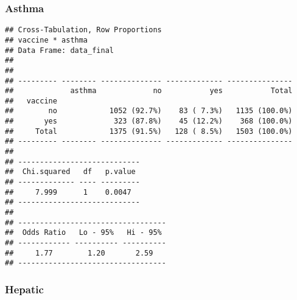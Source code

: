 \documentclass[
]{article}
\newenvironment{Shaded}{\begin{snugshade}}{\end{snugshade}}
\newcommand{\AttributeTok}[1]{\textcolor[rgb]{0.77,0.63,0.00}{#1}}
\newcommand{\ConstantTok}[1]{\textcolor[rgb]{0.00,0.00,0.00}{#1}}
\newcommand{\FunctionTok}[1]{\textcolor[rgb]{0.00,0.00,0.00}{#1}}
\newcommand{\NormalTok}[1]{#1}
\newcommand{\SpecialCharTok}[1]{\textcolor[rgb]{0.00,0.00,0.00}{#1}}
\newcommand{\StringTok}[1]{\textcolor[rgb]{0.31,0.60,0.02}{#1}}
\begin{document}
\hypertarget{asthma}{%
\subsubsection{Asthma}\label{asthma}}

\begin{Shaded}
\end{Shaded}

\begin{verbatim}
## Cross-Tabulation, Row Proportions  
## vaccine * asthma  
## Data Frame: data_final  
## 
## 
## --------- -------- -------------- ------------- ---------------
##             asthma             no           yes           Total
##   vaccine                                                      
##        no            1052 (92.7%)    83 ( 7.3%)   1135 (100.0%)
##       yes             323 (87.8%)    45 (12.2%)    368 (100.0%)
##     Total            1375 (91.5%)   128 ( 8.5%)   1503 (100.0%)
## --------- -------- -------------- ------------- ---------------
## 
## ----------------------------
##  Chi.squared   df   p.value 
## ------------- ---- ---------
##     7.999      1    0.0047  
## ----------------------------
## 
## ----------------------------------
##  Odds Ratio   Lo - 95%   Hi - 95% 
## ------------ ---------- ----------
##     1.77        1.20       2.59   
## ----------------------------------
\end{verbatim}

\hypertarget{hepatic}{%
\subsubsection{Hepatic}\label{hepatic}}

\begin{Shaded}
\end{Shaded}
\end{document}
